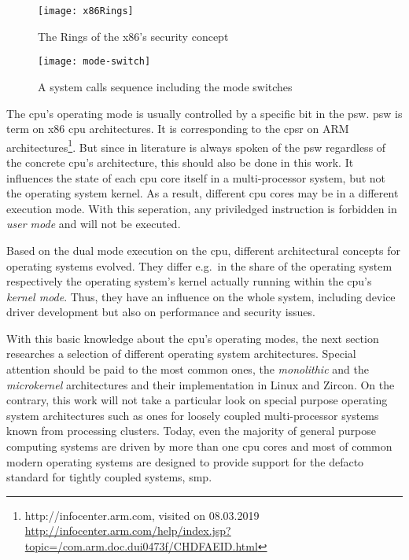 %
%
\begin{figure} [ht]
	\centering
	\texttt{[image: x86Rings]}
	\caption{The Rings of the x86's security concept\cite{glatz2015betriebssysteme}}\label{pic:x86rings}
\end{figure}
%
\begin{figure} [ht]
	\centering
	\texttt{[image: mode-switch]}
    \caption{A system calls sequence including the mode switches\cite{glatz2015betriebssysteme}}\label{pic:mode-switches}
\end{figure}

The \ac{cpu}'s operating mode is usually controlled by a specific bit in the \ac{psw}\cite{tanenbaum-modern-operating-systems}.
\ac{psw} is term on x86 \ac{cpu} architectures. 
It is corresponding to the \ac{cpsr} on ARM architectures\footnote{http://infocenter.arm.com, visited on 08.03.2019 \url{http://infocenter.arm.com/help/index.jsp?topic=/com.arm.doc.dui0473f/CHDFAEID.html}}.
But since in literature is always spoken of the \ac{psw} regardless of the concrete \ac{cpu}'s architecture, this should also be done in this work.
It influences the state of each \ac{cpu} core itself in a multi-processor system, but not the operating system kernel.
As a result, different \ac{cpu} cores may be in a different execution mode\cite{lfd430}.
With this seperation, any priviledged instruction is forbidden in \textit{user mode} and will not be executed.

Based on the dual mode execution on the \ac{cpu}, different architectural concepts for operating systems evolved.
They differ e.g.\ in the share of the operating system respectively the operating system's kernel actually running within the \ac{cpu}'s \textit{kernel mode}. 
Thus, they have an influence on the whole system, including device driver development but also on performance and security issues.

With this basic knowledge about the \ac{cpu}'s operating modes, the next section researches a selection of different operating system architectures.
Special attention should be paid to the most common ones, the \textit{monolithic} and the \textit{microkernel} architectures and their implementation in Linux and Zircon.
On the contrary, this work will not take a particular look on special purpose operating system architectures such as ones for loosely coupled multi-processor systems known from processing clusters.
Today, even the majority of general purpose computing systems are driven by more than one \ac{cpu} cores and most of common modern operating systems are designed to provide support for the defacto standard for tightly coupled systems, \ac{smp}.


